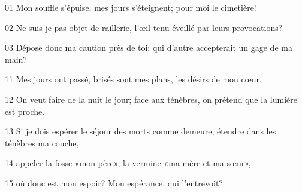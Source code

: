 01 Mon souffle s’épuise, mes jours s’éteignent; pour moi le cimetière!

02 Ne suis-je pas objet de raillerie, l’œil tenu éveillé par leurs provocations?

03 Dépose donc ma caution près de toi: qui d’autre accepterait un gage de ma main?

11 Mes jours ont passé, brisés sont mes plans, les désirs de mon cœur.

12 On veut faire de la nuit le jour; face aux ténèbres, on prétend que la lumière est proche.

13 Si je dois espérer le séjour des morts comme demeure, étendre dans les ténèbres ma couche,

14 appeler la fosse «mon père», la vermine «ma mère et ma sœur»,

15 où donc est mon espoir? Mon espérance, qui l’entrevoit?
